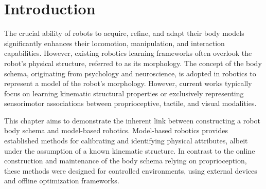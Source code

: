 \section{Introduction}

The crucial ability of robots to acquire, refine, and adapt their body models significantly enhances their locomotion, manipulation, and interaction capabilities. However, existing robotics learning frameworks often overlook the robot's physical structure, referred to as its morphology. The concept of the body schema, originating from psychology and neuroscience, is adopted in robotics to represent a model of the robot's morphology. However, current works typically focus on learning kinematic structural properties or exclusively representing sensorimotor associations between proprioceptive, tactile, and visual modalities.

This chapter aims to demonstrate the inherent link between constructing a robot body schema and model-based robotics. Model-based robotics provides established methods for calibrating and identifying physical attributes, albeit under the assumption of a known kinematic structure. In contrast to the online construction and maintenance of the body schema relying on proprioception, these methods were designed for controlled environments, using external devices and offline optimization frameworks.

